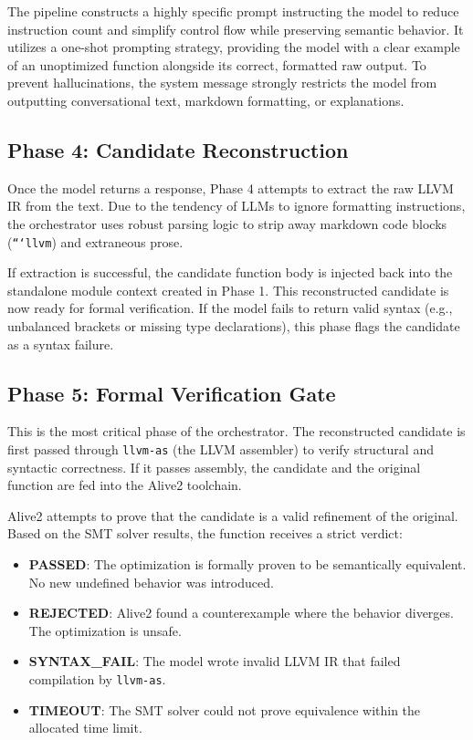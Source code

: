 \documentclass[conference,10pt]{IEEEtran}
\begin{document}
The pipeline constructs a highly specific prompt instructing the model to reduce instruction count and simplify control flow while preserving semantic behavior. It utilizes a one-shot prompting strategy, providing the model with a clear example of an unoptimized function alongside its correct, formatted raw output. To prevent hallucinations, the system message strongly restricts the model from outputting conversational text, markdown formatting, or explanations.

\subsection{Phase 4: Candidate Reconstruction}
Once the model returns a response, Phase 4 attempts to extract the raw LLVM IR from the text. Due to the tendency of LLMs to ignore formatting instructions, the orchestrator uses robust parsing logic to strip away markdown code blocks (\texttt{```llvm}) and extraneous prose. 

If extraction is successful, the candidate function body is injected back into the standalone module context created in Phase 1. This reconstructed candidate is now ready for formal verification. If the model fails to return valid syntax (e.g., unbalanced brackets or missing type declarations), this phase flags the candidate as a syntax failure.

\subsection{Phase 5: Formal Verification Gate}
This is the most critical phase of the orchestrator. The reconstructed candidate is first passed through \texttt{llvm-as} (the LLVM assembler) to verify structural and syntactic correctness. If it passes assembly, the candidate and the original function are fed into the Alive2 toolchain. 

Alive2 attempts to prove that the candidate is a valid refinement of the original. Based on the SMT solver results, the function receives a strict verdict:
\begin{itemize}
    \item \textbf{PASSED}: The optimization is formally proven to be semantically equivalent. No new undefined behavior was introduced.
    \item \textbf{REJECTED}: Alive2 found a counterexample where the behavior diverges. The optimization is unsafe.
    \item \textbf{SYNTAX\_FAIL}: The model wrote invalid LLVM IR that failed compilation by \texttt{llvm-as}.
    \item \textbf{TIMEOUT}: The SMT solver could not prove equivalence within the allocated time limit.
\end{itemize}
\end{document}
